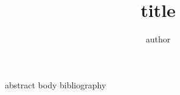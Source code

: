 \documentclass[11pt,twocolumn]{article}
\begin{document}
\title{{{title}}}
\author{{{author}}}
\maketitle
{{abstract}}
{{body}}
{{bibliography}}
\end{document}
